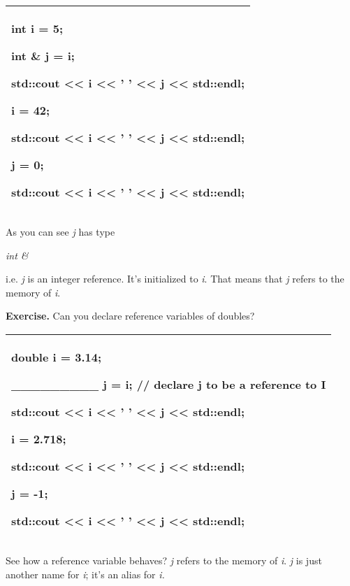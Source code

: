 \documentclass[
]{article}
\begin{document}
\begin{longtable}[]{@{}l@{}}
\toprule
\endhead
\begin{minipage}[t]{0.97\columnwidth}\raggedright
int i = 5;

int \& j = i;

std::cout \textless\textless{} i \textless\textless{} ' '
\textless\textless{} j \textless\textless{} std::endl;

i = 42;

std::cout \textless\textless{} i \textless\textless{} ' '
\textless\textless{} j \textless\textless{} std::endl;

j = 0;

std::cout \textless\textless{} i \textless\textless{} ' '
\textless\textless{} j \textless\textless{} std::endl;\strut
\end{minipage}\tabularnewline
\bottomrule
\end{longtable}

As you can see \emph{j} has type

\emph{int \&}

i.e. \emph{j} is an integer reference. It's initialized to \emph{i}.
That means that \emph{j} refers to the memory of \emph{i}.

\textbf{Exercise.} Can you declare reference variables of doubles?

\begin{longtable}[]{@{}l@{}}
\toprule
\endhead
\begin{minipage}[t]{0.97\columnwidth}\raggedright
double i = 3.14;

\_\_\_\_\_\_\_\_\_ j = i; // declare j to be a reference to I

std::cout \textless\textless{} i \textless\textless{} ' '
\textless\textless{} j \textless\textless{} std::endl;

i = 2.718;

std::cout \textless\textless{} i \textless\textless{} ' '
\textless\textless{} j \textless\textless{} std::endl;

j = -1;

std::cout \textless\textless{} i \textless\textless{} ' '
\textless\textless{} j \textless\textless{} std::endl;\strut
\end{minipage}\tabularnewline
\bottomrule
\end{longtable}

See how a reference variable behaves? \emph{j} refers to the memory of
\emph{i}. \emph{j} is just another name for \emph{i}; it's an alias for
\emph{i.}
\end{document}
